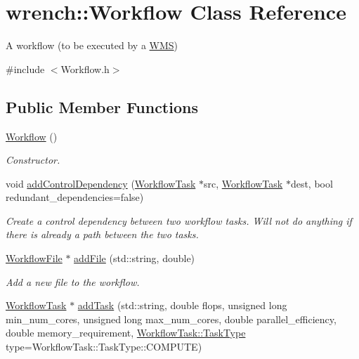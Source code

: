 \hypertarget{classwrench_1_1_workflow}{}\section{wrench\+:\+:Workflow Class Reference}
\label{classwrench_1_1_workflow}


A workflow (to be executed by a \hyperlink{classwrench_1_1_w_m_s}{W\+MS})  




{\ttfamily \#include $<$Workflow.\+h$>$}

\subsection*{Public Member Functions}
\begin{DoxyCompactItemize}
\item 
\mbox{\label{classwrench_1_1_workflow_a8447e0cbd59b4874bf47f8e2480a5a4d}} 
\hyperlink{classwrench_1_1_workflow_a8447e0cbd59b4874bf47f8e2480a5a4d}{Workflow} ()
\begin{DoxyCompactList}\small\item\em Constructor. \end{DoxyCompactList}\item 
void \hyperlink{classwrench_1_1_workflow_a1249e2430c541344d622d75519e4851b}{add\+Control\+Dependency} (\hyperlink{classwrench_1_1_workflow_task}{Workflow\+Task} $\ast$src, \hyperlink{classwrench_1_1_workflow_task}{Workflow\+Task} $\ast$dest, bool redundant\+\_\+dependencies=false)
\begin{DoxyCompactList}\small\item\em Create a control dependency between two workflow tasks. Will not do anything if there is already a path between the two tasks. \end{DoxyCompactList}\item 
\hyperlink{classwrench_1_1_workflow_file}{Workflow\+File} $\ast$ \hyperlink{classwrench_1_1_workflow_a0e1f7dc16f875f18c0990e6bd1843932}{add\+File} (std\+::string, double)
\begin{DoxyCompactList}\small\item\em Add a new file to the workflow. \end{DoxyCompactList}\item 
\hyperlink{classwrench_1_1_workflow_task}{Workflow\+Task} $\ast$ \hyperlink{classwrench_1_1_workflow_aa19c92f95eaf58aed7924adb426d01bf}{add\+Task} (std\+::string, double flops, unsigned long min\+\_\+num\+\_\+cores, unsigned long max\+\_\+num\+\_\+cores, double parallel\+\_\+efficiency, double memory\+\_\+requirement, \hyperlink{classwrench_1_1_workflow_task_a490a935259b9425a3e4fb011a86cb4bf}{Workflow\+Task\+::\+Task\+Type} type=Workflow\+Task\+::\+Task\+Type\+::\+C\+O\+M\+P\+U\+TE)

\end{DoxyCompactItemize}
